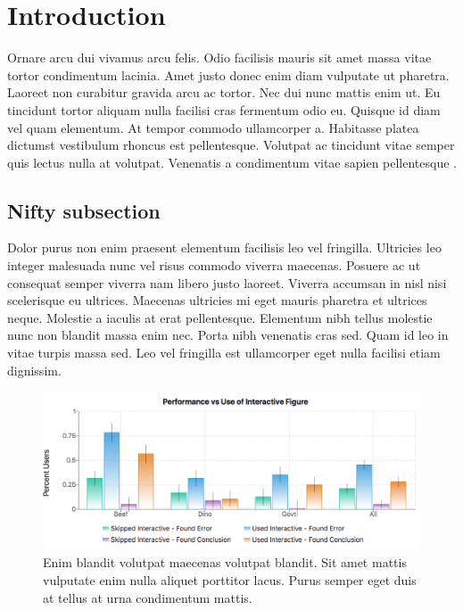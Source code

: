 \documentclass[12pt,twoside]{mitthesis}
\begin{document}

\pagestyle{plain}

\tableofcontents
\newpage
\listoffigures
\newpage
\listoftables


\chapter{Introduction}
Ornare arcu dui vivamus arcu felis. Odio facilisis mauris sit amet massa vitae tortor condimentum lacinia. Amet justo donec enim diam vulputate ut pharetra. Laoreet non curabitur gravida arcu ac tortor. Nec dui nunc mattis enim ut. Eu tincidunt tortor aliquam nulla facilisi cras fermentum odio eu. Quisque id diam vel quam elementum. At tempor commodo ullamcorper a. Habitasse platea dictumst vestibulum rhoncus est pellentesque. Volutpat ac tincidunt vitae semper quis lectus nulla at volutpat. Venenatis a condimentum vitae sapien pellentesque \cite{myCitation}.

\section{Nifty subsection}

Dolor purus non enim praesent elementum facilisis leo vel fringilla. Ultricies leo integer malesuada nunc vel risus commodo viverra maecenas. Posuere ac ut consequat semper viverra nam libero justo laoreet. Viverra accumsan in nisl nisi scelerisque eu ultrices. Maecenas ultricies mi eget mauris pharetra et ultrices neque. Molestie a iaculis at erat pellentesque. Elementum nibh tellus molestie nunc non blandit massa enim nec. Porta nibh venenatis cras sed. Quam id leo in vitae turpis massa sed. Leo vel fringilla est ullamcorper eget nulla facilisi etiam dignissim.

\begin{figure}[htb]
\begin{center}
\leavevmode
\includegraphics[width=\textwidth]{figures/myFigure.png}
\end{center}
\caption{Enim blandit volutpat maecenas volutpat blandit. Sit amet mattis vulputate enim nulla aliquet porttitor lacus. Purus semper eget duis at tellus at urna condimentum mattis.}
\end{figure}
\end{document}
